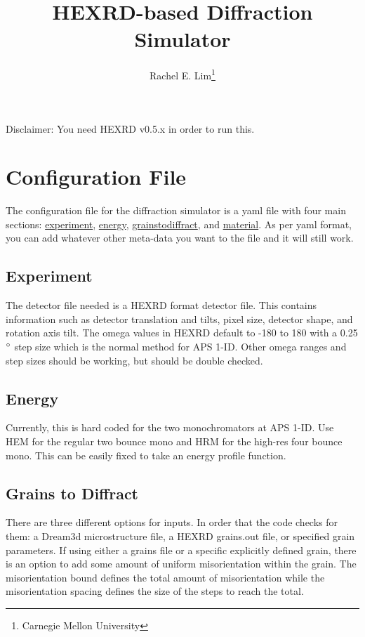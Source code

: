 \documentclass[12pt]{article}
\begin{document}
	
	\title{HEXRD-based Diffraction Simulator}
	\author{Rachel E. Lim\thanks{Carnegie Mellon University}}
	
	\maketitle
	
Disclaimer: You need HEXRD v0.5.x in order to run this.


\section{Configuration File}
The configuration file for the diffraction simulator is a yaml file with four main sections:  \hyperref[sec:experiment]{experiment}, \hyperref[sec:energy]{energy}, \hyperref[sec:grains]{grains\textunderscore to\textunderscore diffract}, and \hyperref[sec:material]{material}. As per yaml format, you can add whatever other meta-data you want to the file and it will still work.
	
	\subsection{Experiment} \label{sec:experiment}
	The detector file needed is a HEXRD format detector file. This contains information such as detector translation and tilts, pixel size, detector shape, and rotation axis tilt. The omega values in HEXRD default to -180 to 180 with a 0.25$\degree$ step size which is the normal method for APS 1-ID. Other omega ranges and step sizes should be working, but should be double checked. 
	
	\subsection{Energy} \label{sec:energy}
	Currently, this is hard coded for the two monochromators at APS 1-ID. Use HEM for the regular two bounce mono and HRM for the high-res four bounce mono. This can be easily fixed to take an energy profile function.
	
	\subsection{Grains to Diffract} \label{sec:grains}
	There are three different options for inputs. In order that the code checks for them: a Dream3d microstructure file, a HEXRD grains.out file, or specified grain parameters. If using either a grains file or a specific explicitly defined grain, there is an option to add some amount of uniform misorientation within the grain. The misorientation bound defines the total amount of misorientation while the misorientation spacing defines the size of the steps to reach the total.
	
\end{document}
